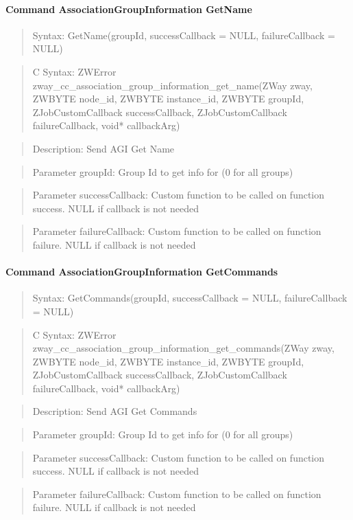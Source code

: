 \paragraph{Command AssociationGroupInformation GetName}
\begin{quote}Syntax: GetName(groupId, successCallback = NULL, failureCallback = NULL)\end{quote}
\begin{quote}C Syntax: ZWError zway\_cc\_association\_group\_information\_get\_name(ZWay zway, ZWBYTE node\_id, ZWBYTE instance\_id, ZWBYTE groupId, ZJobCustomCallback successCallback, ZJobCustomCallback failureCallback, void* callbackArg)\end{quote}
\begin{quote}Description: Send AGI Get Name\end{quote}
\begin{quote}Parameter groupId: Group Id to get info for (0 for all groups)\end{quote}
\begin{quote}Parameter successCallback: Custom function to be called on function success. NULL if callback is not needed\end{quote}
\begin{quote}Parameter failureCallback: Custom function to be called on function failure. NULL if callback is not needed\end{quote}


\paragraph{Command AssociationGroupInformation GetCommands}
\begin{quote}Syntax: GetCommands(groupId, successCallback = NULL, failureCallback = NULL)\end{quote}
\begin{quote}C Syntax: ZWError zway\_cc\_association\_group\_information\_get\_commands(ZWay zway, ZWBYTE node\_id, ZWBYTE instance\_id, ZWBYTE groupId, ZJobCustomCallback successCallback, ZJobCustomCallback failureCallback, void* callbackArg)\end{quote}
\begin{quote}Description: Send AGI Get Commands\end{quote}
\begin{quote}Parameter groupId: Group Id to get info for (0 for all groups)\end{quote}
\begin{quote}Parameter successCallback: Custom function to be called on function success. NULL if callback is not needed\end{quote}
\begin{quote}Parameter failureCallback: Custom function to be called on function failure. NULL if callback is not needed\end{quote}



